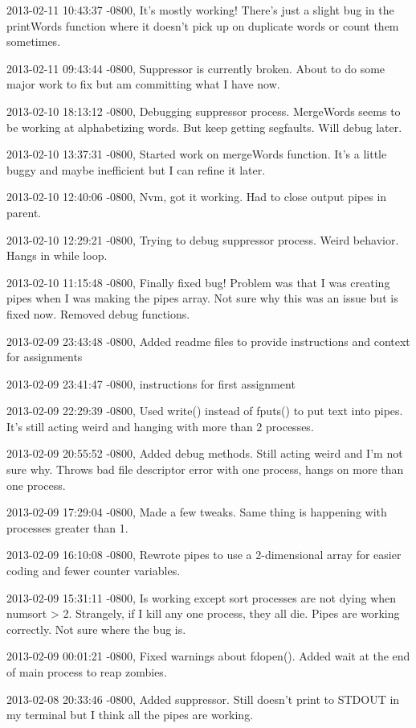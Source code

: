 \documentclass[letterpaper,10pt,titlepage]{article}
\begin{document}
\begin{enumerate}
2013-02-11 10:43:37 -0800, It's mostly working! There's just a slight bug in the printWords function where it doesn't pick up on duplicate words or count them sometimes.

2013-02-11 09:43:44 -0800, Suppressor is currently broken. About to do some major work to fix but am committing what I have now.

2013-02-10 18:13:12 -0800, Debugging suppressor process. MergeWords seems to be working at alphabetizing words. But keep getting segfaults. Will debug later.

2013-02-10 13:37:31 -0800, Started work on mergeWords function. It's a little buggy and maybe inefficient but I can refine it later.

2013-02-10 12:40:06 -0800, Nvm, got it working. Had to close output pipes in parent.

2013-02-10 12:29:21 -0800, Trying to debug suppressor process. Weird behavior. Hangs in while loop.

2013-02-10 11:15:48 -0800, Finally fixed bug! Problem was that I was creating pipes when I was making the pipes array. Not sure why this was an issue but is fixed now. Removed debug functions.

2013-02-09 23:43:48 -0800, Added readme files to provide instructions and context for assignments

2013-02-09 23:41:47 -0800, instructions for first assignment

2013-02-09 22:29:39 -0800, Used write() instead of fputs() to put text into pipes. It's still acting weird and hanging with more than 2 processes.

2013-02-09 20:55:52 -0800, Added debug methods. Still acting weird and I'm not sure why. Throws bad file descriptor error with one process, hangs on more than one process.

2013-02-09 17:29:04 -0800, Made a few tweaks. Same thing is happening with processes greater than 1.

2013-02-09 16:10:08 -0800, Rewrote pipes to use a 2-dimensional array for easier coding and fewer counter variables.

2013-02-09 15:31:11 -0800, Is working except sort processes are not dying when numsort > 2. Strangely, if I kill any one process, they all die. Pipes are working correctly. Not sure where the bug is.

2013-02-09 00:01:21 -0800, Fixed warnings about fdopen(). Added wait at the end of main process to reap zombies.

2013-02-08 20:33:46 -0800, Added suppressor. Still doesn't print to STDOUT in my terminal but I think all the pipes are working.


\end{enumerate}
\end{document}
